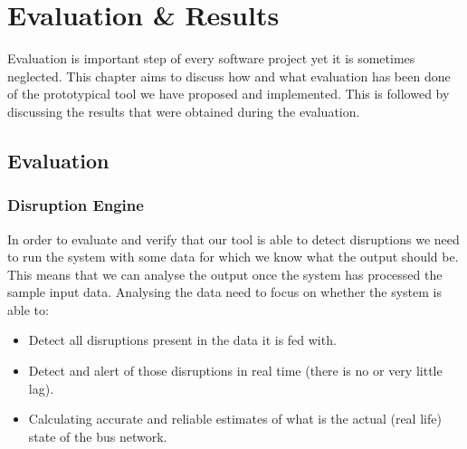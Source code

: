 \chapter{Evaluation \& Results}
Evaluation is important step of every software project yet it is sometimes neglected. This chapter aims to discuss how and what evaluation has been done of the prototypical tool we have proposed and implemented. This is followed by discussing the results that were obtained during the evaluation.

\section{Evaluation}

\subsection{Disruption Engine}
In order to evaluate and verify that our tool is able to detect disruptions we need to run the system with some data for which we know what the output should be. This means that we can analyse the output once the system has processed the sample input data. Analysing the data need to focus on whether the system is able to:
\begin{itemize}
	\item Detect all disruptions present in the data it is fed with.
	\item Detect and alert of those disruptions in real time (there is no or very little lag).
	\item Calculating accurate and reliable estimates of what is the actual (real life) state of the bus network.
\end{itemize}

